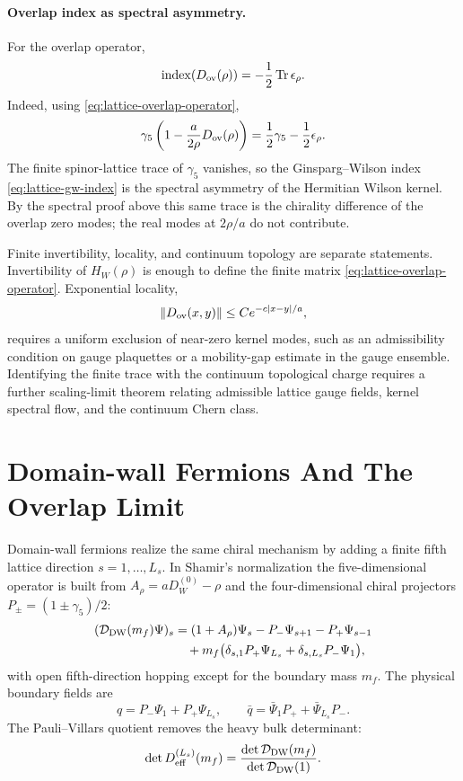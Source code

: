 \paragraph{Overlap index as spectral asymmetry.}
For the overlap operator,
\[
  \operatorname{index}(D_{\rm ov}(\rho))
  =
  -\frac12\operatorname{Tr}\epsilon_\rho .
\]
Indeed, using \eqref{eq:lattice-overlap-operator},
\[
  \gamma_5\left(1-\frac{a}{2\rho}D_{\rm ov}(\rho)\right)
  =
  \frac12\gamma_5-\frac12\epsilon_\rho .
\]
The finite spinor-lattice trace of \(\gamma_5\) vanishes, so the
Ginsparg--Wilson index \eqref{eq:lattice-gw-index} is the spectral asymmetry
of the Hermitian Wilson kernel.  By the spectral proof above this same trace
is the chirality difference of the overlap zero modes; the real modes at
\(2\rho/a\) do not contribute.

Finite invertibility, locality, and continuum topology are separate
statements.  Invertibility of \(H_W(\rho)\) is enough to define the finite
matrix \eqref{eq:lattice-overlap-operator}.  Exponential locality,
\[
  \|D_{\rm ov}(x,y)\|\leq C e^{-c|x-y|/a},
\]
requires a uniform exclusion of near-zero kernel modes, such as an
admissibility condition on gauge plaquettes or a mobility-gap estimate in the
gauge ensemble.  Identifying the finite trace with the continuum topological
charge requires a further scaling-limit theorem relating admissible lattice
gauge fields, kernel spectral flow, and the continuum Chern class.

\section{Domain-wall Fermions And The Overlap Limit}

Domain-wall fermions realize the same chiral mechanism by adding a finite
fifth lattice direction \(s=1,\ldots,L_s\).  In Shamir's normalization the
five-dimensional operator is built from \(A_\rho=aD_W^{(0)}-\rho\) and the
four-dimensional chiral projectors \(P_\pm=(1\pm\gamma_5)/2\):
\[
\begin{aligned}
  (\mathcal D_{\rm DW}(m_f)\Psi)_s
  &=
  (1+A_\rho)\Psi_s
  -P_-\Psi_{s+1}
  -P_+\Psi_{s-1}                                      \\
  &\quad
  +m_f\bigl(\delta_{s,1}P_+\Psi_{L_s}
            +\delta_{s,L_s}P_-\Psi_1\bigr),
\end{aligned}
\]
with open fifth-direction hopping except for the boundary mass \(m_f\).  The
physical boundary fields are
\[
  q=P_-\Psi_1+P_+\Psi_{L_s},
  \qquad
  \bar q=\bar\Psi_1P_+ + \bar\Psi_{L_s}P_- .
\]
The Pauli--Villars quotient removes the heavy bulk determinant:
\[
  \det D_{\rm eff}^{(L_s)}(m_f)
  =
  \frac{\det\mathcal D_{\rm DW}(m_f)}
       {\det\mathcal D_{\rm DW}(1)} .
\]

